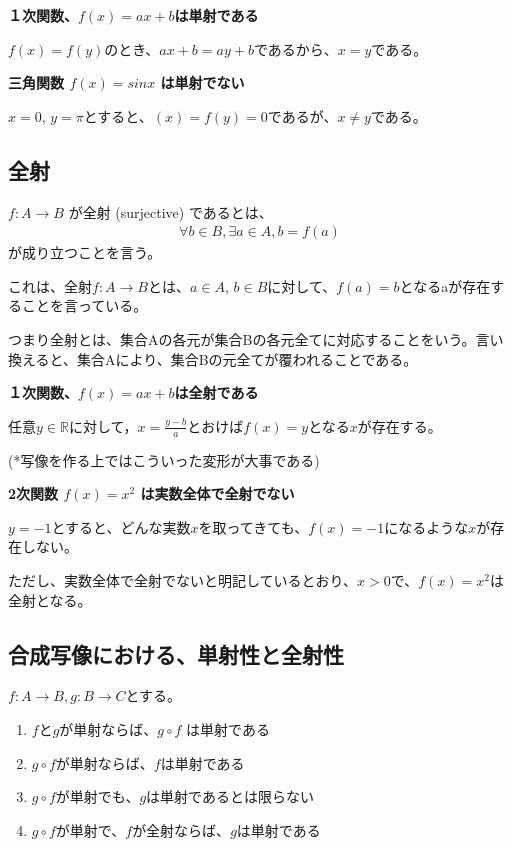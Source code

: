 \documentclass[dvipdfmx,autodetect-engine]{jsarticle}
\begin{document}
\exam

{\bf １次関数、$f(x) = ax+b$は単射である }

$f(x) = f(y)$のとき、$ax+b = ay+b$であるから、$x=y$である。

\exam
{\bf 三角関数 $f(x) = sinx$ は単射でない }

$x=0$, $y=\pi$とすると、$(x) = f(y) =0$であるが、$x \neq y$である。

\subsection{全射}

$f: A \to B$ が全射 (surjective) であるとは、
\begin{eqnarray*}
\forall b \in B, \exists a \in A, b = f(a)
\end{eqnarray*}
が成り立つことを言う。

これは、全射$f: A \to B$とは、$a \in A$, $b \in B$に対して、$f(a) = b$となるaが存在することを言っている。

つまり全射とは、集合Aの各元が集合Bの各元全てに対応することをいう。言い換えると、集合Aにより、集合Bの元全てが覆われることである。

\exam

{\bf １次関数、$f(x) = ax+b$は全射である}

任意$y \in \mathbb{R}$に対して，$x = \frac{y-b}{a}$とおけば$f(x) = y$となる$x$が存在する。

(*写像を作る上ではこういった変形が大事である)


\exam
{\bf 2次関数 $f(x)=x^2$ は実数全体で全射でない}

$y=-1$とすると、どんな実数$x$を取ってきても、$f(x) = -1$になるような$x$が存在しない。

ただし、実数全体で全射でないと明記しているとおり、$x > 0$で、$f(x)=x^2$は全射となる。


\subsection{合成写像における、単射性と全射性}

\label{eq:injectiveProposition}
 
 $f:A \to B, g: B \to C$とする。

\begin{enumerate}
\renewcommand{\labelenumi}{(\arabic{enumi})}
	\item $f$と$g$が単射ならば、$g \circ f$ は単射である
	\item $g \circ f$が単射ならば、$f$は単射である
	\item $g \circ f$が単射でも、$g$は単射であるとは限らない
	\item $g \circ f$が単射で、$f$が全射ならば、$g$は単射である
\end{enumerate}
\end{document}
